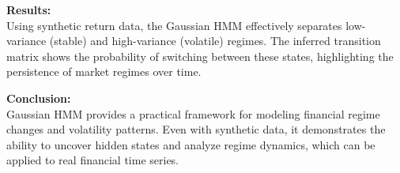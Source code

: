 \documentclass[a4paper,12pt]{article}  %
\begin{document}
\vspace{3mm}
\noindent \textbf{Results:} \\
Using synthetic return data, the Gaussian HMM effectively separates low-variance (stable) and high-variance (volatile) regimes. The inferred transition matrix shows the probability of switching between these states, highlighting the persistence of market regimes over time.

\vspace{3mm}
\noindent \textbf{Conclusion:} \\
Gaussian HMM provides a practical framework for modeling financial regime changes and volatility patterns. Even with synthetic data, it demonstrates the ability to uncover hidden states and analyze regime dynamics, which can be applied to real financial time series.
\end{document}
